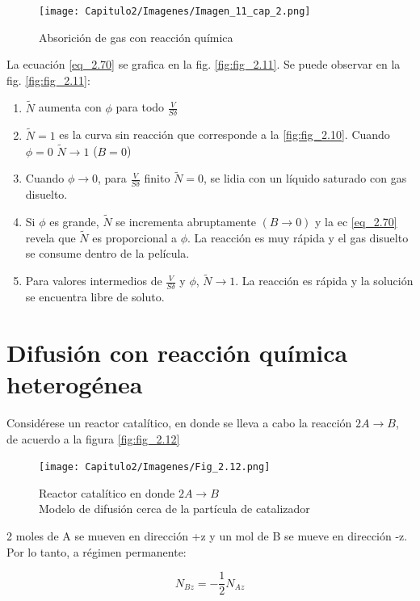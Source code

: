 \begin{figure}[H]
    \centering
    \texttt{[image: Capitulo2/Imagenes/Imagen\_11\_cap\_2.png]}
    \caption{Absorición de gas con reacción química}
    \label{fig:fig_2.11}
\end{figure}

La ecuación \eqref{eq_2.70} se grafica en la fig. \eqref{fig:fig_2.11}. Se puede observar en la fig. \eqref{fig:fig_2.11}:
\begin{enumerate}
    \item $\widetilde{N}$ aumenta con $\phi$ para todo $\frac{V}{S\delta}$
    \item $\widetilde{N}=1$ es la curva sin reacción que corresponde a la \eqref{fig:fig_2.10}. Cuando $\phi=0$ $\widetilde{N}\rightarrow1$ ($B=0$)
    \item Cuando $\phi\rightarrow0$, para $\frac{V}{S\delta}$ finito $\widetilde{N}=0$, se lidia con un líquido saturado con gas disuelto.
    \item Si $\phi$ es grande, $\widetilde{N}$ se incrementa abruptamente $(B\rightarrow 0)$ y la ec \eqref{eq_2.70} revela que $\widetilde{N}$ es proporcional a $\phi$. La reacción es muy rápida y el gas disuelto se consume dentro de la película. 
    \item Para valores intermedios de $\frac{V}{S\delta}$ y $\phi$, $\widetilde{N}\rightarrow1$. La reacción es rápida y la solución se encuentra libre de soluto. 

\end{enumerate}

\section{Difusión con reacción química heterogénea}

Considérese un reactor catalítico, en donde se lleva a cabo la reacción $2A\rightarrow B$, de acuerdo a la figura \eqref{fig:fig_2.12}

\begin{figure}[H]
    \centering
    \texttt{[image: Capitulo2/Imagenes/Fig\_2.12.png]}
    \caption{Reactor catalítico en donde $2A\to B$\\Modelo de difusión cerca de la partícula de catalizador}
    \label{fig:fig_2.12}
\end{figure}

2 moles de A se mueven en dirección +z y un mol de B se mueve en dirección -z. Por lo tanto, a régimen permanente:

\begin{equation}
    N_{Bz}=-\frac{1}{2}N_{Az}
    \label{eq_2.71}
\end{equation}

